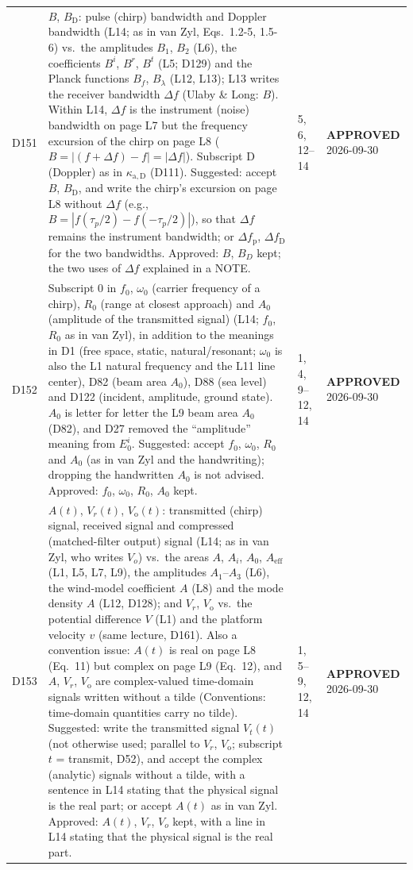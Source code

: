 \documentclass[11pt, oneside]{article}
\newcommand{\approved}{\textbf{APPROVED}}
\begin{document}
\begin{longtable}{l >{\raggedright\arraybackslash}p{} l l}
D151 & $B$, $B_\mathrm{D}$: pulse (chirp) bandwidth and Doppler bandwidth (L14; as in van Zyl, Eqs.~1.2-5, 1.5-6) vs.\ the amplitudes $B_1$, $B_2$ (L6), the coefficients $B^i$, $B^r$, $B^t$ (L5; D129) and the Planck functions $B_f$, $B_\lambda$ (L12, L13); L13 writes the receiver bandwidth $\Delta f$ (Ulaby \& Long: $B$). Within L14, $\Delta f$ is the instrument (noise) bandwidth on page L7 but the frequency excursion of the chirp on page L8 ($B = |(f + \Delta f) - f| = |\Delta f|$). Subscript D (Doppler) as in $\kappa_{\mathrm{a},\mathrm{D}}$ (D111). Suggested: accept $B$, $B_\mathrm{D}$, and write the chirp's excursion on page L8 without $\Delta f$ (e.g., $B = |f(\tau_p/2) - f(-\tau_p/2)|$), so that $\Delta f$ remains the instrument bandwidth; or $\Delta f_\mathrm{p}$, $\Delta f_\mathrm{D}$ for the two bandwidths. Approved: $B$, $B_D$ kept; the two uses of $\Delta f$ explained in a NOTE. & 5, 6, 12--14 & \approved{} 2026-09-30 \\
D152 & Subscript 0 in $f_0$, $\omega_0$ (carrier frequency of a chirp), $R_0$ (range at closest approach) and $A_0$ (amplitude of the transmitted signal) (L14; $f_0$, $R_0$ as in van Zyl), in addition to the meanings in D1 (free space, static, natural/resonant; $\omega_0$ is also the L1 natural frequency and the L11 line center), D82 (beam area $A_0$), D88 (sea level) and D122 (incident, amplitude, ground state). $A_0$ is letter for letter the L9 beam area $A_0$ (D82), and D27 removed the ``amplitude'' meaning from $E_0^i$. Suggested: accept $f_0$, $\omega_0$, $R_0$ and $A_0$ (as in van Zyl and the handwriting); dropping the handwritten $A_0$ is not advised. Approved: $f_0$, $\omega_0$, $R_0$, $A_0$ kept. & 1, 4, 9--12, 14 & \approved{} 2026-09-30 \\
D153 & $A(t)$, $V_r(t)$, $V_\mathrm{o}(t)$: transmitted (chirp) signal, received signal and compressed (matched-filter output) signal (L14; as in van Zyl, who writes $V_o$) vs.\ the areas $A$, $A_i$, $A_0$, $A_\mathrm{eff}$ (L1, L5, L7, L9), the amplitudes $A_1$--$A_3$ (L6), the wind-model coefficient $A$ (L8) and the mode density $A$ (L12, D128); and $V_r$, $V_\mathrm{o}$ vs.\ the potential difference $V$ (L1) and the platform velocity $v$ (same lecture, D161). Also a convention issue: $A(t)$ is real on page L8 (Eq.~11) but complex on page L9 (Eq.~12), and $A$, $V_r$, $V_\mathrm{o}$ are complex-valued time-domain signals written without a tilde (Conventions: time-domain quantities carry no tilde). Suggested: write the transmitted signal $V_t(t)$ (not otherwise used; parallel to $V_r$, $V_\mathrm{o}$; subscript $t$ = transmit, D52), and accept the complex (analytic) signals without a tilde, with a sentence in L14 stating that the physical signal is the real part; or accept $A(t)$ as in van Zyl. Approved: $A(t)$, $V_r$, $V_o$ kept, with a line in L14 stating that the physical signal is the real part. & 1, 5--9, 12, 14 & \approved{} 2026-09-30 \\

\end{longtable}
\end{document}
